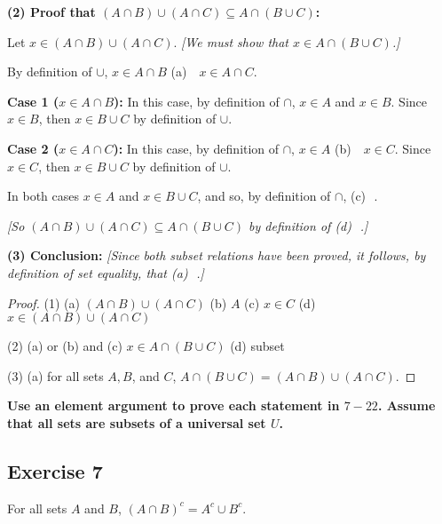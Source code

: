 \documentclass[14pt]{extarticle}
\newcommand{\fbl}{\underline{\hspace{1cm}}\,\,}
\newcommand{\cy}{\color{cyan}}
\begin{document}
{\bf (2) Proof that \((A \cap B) \cup (A \cap C) \subseteq A \cap (B \cup C)\):}

Let \(x \in (A \cap B) \cup (A \cap C)\). {\it [We must show that \(x \in A \cap (B \cup C )\).]}

By definition of $\cup$, \(x \in A \cap B\) {\cy (a) \fbl} \(x \in A \cap C.\)

{\bf Case 1 (\(x \in A \cap B\)):} In this case, by definition of $\cap$, \(x \in A\) and \(x \in B\). Since
\(x \in B\), then \(x \in B \cup C\) by definition of $\cup$.

  {\bf Case 2 (\(x \in A \cap C\)):} In this case, by definition of $\cap$, \(x \in A\) {\cy (b) \fbl}
\(x \in C\). Since \(x \in C\), then \(x \in B \cup C\) by definition of $\cup$.

In both cases \(x \in A\) and \(x \in B \cup C\), and so, by definition of $\cap$, {\cy (c) \fbl}.

{\it [So \((A \cap B) \cup (A \cap C) \subseteq A \cap (B \cup C)\) by definition of {\cy (d) \fbl}.]}

{\bf (3) Conclusion:} {\it [Since both subset relations have been proved, it follows, by definition of set equality, that {\cy (a) \fbl}.]}

\begin{proof}
  (1) (a) \((A \cap B) \cup (A \cap C)\) (b) $A$ (c) \(x \in C\) (d) \(x \in (A \cap B) \cup (A \cap C)\)

  (2) (a) or (b) and (c) \(x \in A \cap (B \cup C)\) (d) subset

  (3) (a) for all sets $A, B$, and $C$, \(A \cap (B \cup C) = (A \cap B) \cup (A \cap C)\).
\end{proof}

{\bf \cy Use an element argument to prove each statement in $7-22$. Assume that all sets are subsets of a universal set $U$.}

\subsection{Exercise 7}
For all sets $A$ and $B$, \((A \cap B)^c = A^c \cup B^c\).
\end{document}
